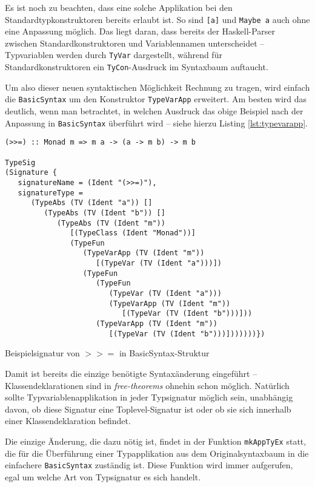Es ist noch zu beachten, dass eine solche Applikation bei den Standardtypkonstruktoren bereits erlaubt ist.
So sind \texttt{[a]} und \texttt{Maybe a} auch ohne eine Anpassung möglich. Das liegt daran, dass bereits der
Haskell-Parser zwischen Standardkonstruktoren und Variablennamen unterscheidet -- Typvariablen werden durch \texttt{TyVar}
dargestellt, während für Standardkonstruktoren ein \texttt{TyCon}-Ausdruck im Syntaxbaum auftaucht.


Um also dieser neuen syntaktischen Möglichkeit Rechnung zu tragen, wird einfach die \texttt{BasicSyntax} um den Konstruktor
\texttt{TypeVarApp} erweitert. Am besten wird das deutlich, wenn man betrachtet, in welchen Ausdruck das obige Beispiel
nach der Anpassung in \texttt{BasicSyntax} überführt wird -- siehe hierzu Listing \ref{lst:typevarapp}.

\begin{listing}[ht]
\begin{verbatim}
(>>=) :: Monad m => m a -> (a -> m b) -> m b

TypeSig
(Signature {
   signatureName = (Ident "(>>=)"),
   signatureType =
      (TypeAbs (TV (Ident "a")) []
         (TypeAbs (TV (Ident "b")) []
            (TypeAbs (TV (Ident "m"))
               [(TypeClass (Ident "Monad"))]
               (TypeFun
                  (TypeVarApp (TV (Ident "m"))
                     [(TypeVar (TV (Ident "a")))])
                  (TypeFun
                     (TypeFun
                        (TypeVar (TV (Ident "a")))
                        (TypeVarApp (TV (Ident "m"))
                           [(TypeVar (TV (Ident "b")))]))
                     (TypeVarApp (TV (Ident "m"))
                        [(TypeVar (TV (Ident "b")))]))))))})
\end{verbatim}
\caption{Beispielsignatur von $>>=$ in BasicSyntax-Struktur}
\label{lst:typevarapp}
\end{listing}

Damit ist bereits die einzige benötigte Syntaxänderung eingeführt -- Klassendeklarationen sind in \textit{free-theorems}
ohnehin schon möglich. Natürlich sollte Typvariablenapplikation in jeder Typsignatur möglich sein, unabhängig davon, ob diese
Signatur eine Toplevel-Signatur ist oder ob sie sich innerhalb einer Klassendeklaration befindet.

Die einzige Änderung, die dazu nötig ist, findet in der Funktion \texttt{mkAppTyEx} statt, die für die Überführung einer
Typapplikation aus dem Originalsyntaxbaum in die einfachere \texttt{BasicSyntax} zuständig ist. Diese Funktion wird immer aufgerufen,
egal um welche Art von Typsignatur es sich handelt.


